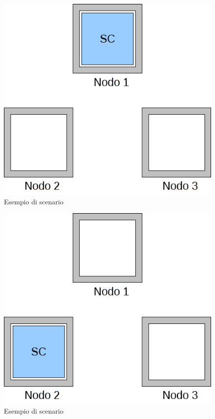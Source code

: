 \begin{figure}[H]
\begin{center}
\includegraphics[scale=0.4]{etc/scenario1-1.png}
\caption{Esempio di scenario}
\label{scenario1}
\end{center}
\end{figure}
\begin{figure}[H]
\begin{center}
\includegraphics[scale=0.4]{etc/scenario1-2.png}
\caption{Esempio di scenario}
\label{scenario2}
\end{center}
\end{figure}
